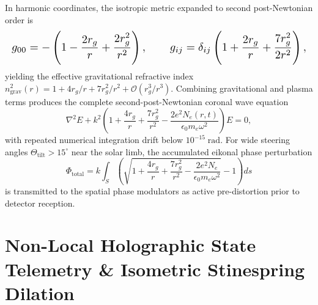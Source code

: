 \documentclass[10pt,twocolumn]{IEEEtran}
\begin{document}
In harmonic coordinates, the isotropic metric expanded to second
post-Newtonian order is
\begin{equation}
\resizebox{\columnwidth}{!}{$\displaystyle
g_{00}=-\left(1-\frac{2r_g}{r}+\frac{2r_g^{2}}{r^{2}}\right),\qquad
g_{ij}=\delta_{ij}\left(1+\frac{2r_g}{r}+\frac{7r_g^{2}}{2r^{2}}\right),$}
\label{eq:metric_2pn}
\end{equation}
yielding the effective gravitational refractive index
$n_{\mathrm{grav}}^{2}(r)=1+4r_g/r+7r_g^{2}/r^{2}
+\mathcal{O}(r_g^{3}/r^{3})$.  Combining gravitational and plasma terms
produces the complete second-post-Newtonian coronal wave equation
\begin{equation}
\nabla^{2}E+k^{2}\left(1+\frac{4r_g}{r}+\frac{7r_g^{2}}{r^{2}}
-\frac{2e^{2}N_e(r,t)}{\epsilon_0 m_e\omega^{2}}\right)E=0,
\label{eq:helmholtz_2pn_corona}
\end{equation}
with repeated numerical integration drift below $10^{-15}\;\mathrm{rad}$.
For wide steering angles $\Theta_{\mathrm{tilt}}>15^{\circ}$ near the
solar limb, the accumulated eikonal phase perturbation
\begin{equation}
\Phi_{\mathrm{total}}=k\int_S\left(
\sqrt{1+\frac{4r_g}{r}+\frac{7r_g^{2}}{r^{2}}
-\frac{2e^{2}N_e}{\epsilon_0 m_e\omega^{2}}}-1\right)ds
\label{eq:eikonal_2pn}
\end{equation}
is transmitted to the spatial phase modulators as active pre-distortion
prior to detector reception.

\section{Non-Local Holographic State Telemetry \& Isometric Stinespring Dilation}
\label{sec:stinespring_telemetry}
\end{document}
